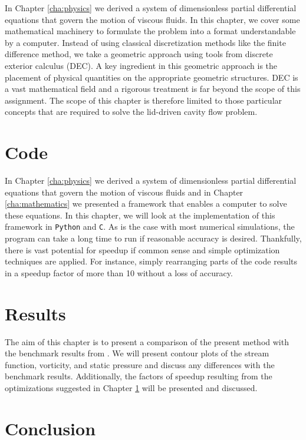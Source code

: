 \documentclass[a4paper, 11pt, toc=bibliography, parskip=half]{scrreprt}
\begin{document}
In Chapter \ref{cha:physics} we derived a system of dimensionless partial differential equations that govern the motion of viscous fluids. In this chapter, we cover some mathematical machinery to formulate the problem into a format understandable by a computer. Instead of using classical discretization methods like the finite difference method, we take a geometric approach using tools from discrete exterior calculus (DEC). A key ingredient in this geometric approach is the placement of physical quantities on the appropriate geometric structures. DEC is a vast mathematical field and a rigorous treatment is far beyond the scope of this assignment. The scope of this chapter is therefore limited to those particular concepts that are required to solve the lid-driven cavity flow problem.







\chapter{Code}
\label{cha:code}

In Chapter \ref{cha:physics} we derived a system of dimensionless partial differential equations that govern the motion of viscous fluids and in Chapter \ref{cha:mathematics} we presented a framework that enables a computer to solve these equations. In this chapter, we will look at the implementation of this framework in \texttt{Python} and \texttt{C}. As is the case with most numerical simulations, the program can take a long time to run if reasonable accuracy is desired. Thankfully, there is vast potential for speedup if common sense and simple optimization techniques are applied. For instance, simply rearranging parts of the code results in a speedup factor of more than 10 without a loss of accuracy.





\chapter{Results}
\label{cha:results}

The aim of this chapter is to present a comparison of the present method with the benchmark results from \parencite{botella1998benchmark}. We will present contour plots of the stream function, vorticity, and static pressure and discuss any differences with the benchmark results. Additionally, the factors of speedup resulting from the optimizations suggested in Chapter \ref{cha:code} will be presented and discussed.



\chapter{Conclusion}
\label{cha:conclusion}



\printbibliography[heading=bibintoc, title={References}]
\end{document}

